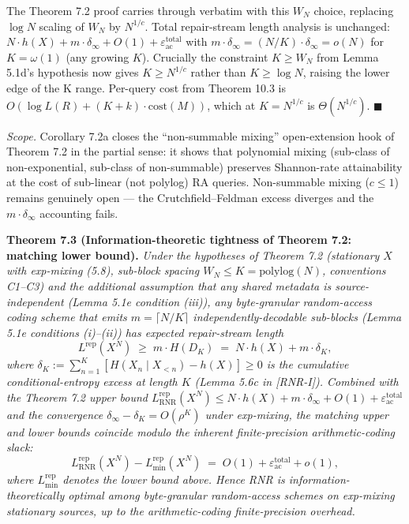 \documentclass[
]{article}
\begin{document}
The Theorem 7.2 proof carries through verbatim with this $W_N$ choice,
replacing $\log N$ scaling of $W_N$ by $N^{1/c}$. Total repair-stream
length analysis is unchanged: $N \cdot h(X) + m \cdot \delta_\infty +
O(1) + \varepsilon_{\mathrm{ac}}^{\mathrm{total}}$ with
$m \cdot \delta_\infty = (N/K) \cdot \delta_\infty = o(N)$ for
$K = \omega(1)$ (any growing $K$). Crucially the constraint
$K \geq W_N$ from Lemma 5.1d's hypothesis now gives
$K \geq N^{1/c}$ rather than $K \geq \log N$, raising the lower edge
of the K range. Per-query cost from Theorem 10.3 is
$O(\log L(R) + (K+k) \cdot \mathrm{cost}(M))$, which at $K = N^{1/c}$
is $\Theta(N^{1/c})$.
\hfill$\blacksquare$

\emph{Scope.} Corollary 7.2a closes the ``non-summable mixing''
open-extension hook of Theorem 7.2 in the partial sense: it shows
that polynomial mixing (sub-class of non-exponential, sub-class of
non-summable) preserves Shannon-rate attainability at the cost of
sub-linear (not polylog) RA queries. Non-summable mixing ($c \leq 1$)
remains genuinely open --- the Crutchfield--Feldman excess diverges
and the $m \cdot \delta_\infty$ accounting fails.

\textbf{Theorem 7.3 (Information-theoretic tightness of Theorem 7.2:
matching lower bound).} \emph{Under the hypotheses of Theorem 7.2
(stationary $X$ with exp-mixing (5.8), sub-block spacing
$W_N \leq K = \mathrm{polylog}(N)$, conventions C1--C3) and the
additional assumption that any shared metadata is source-independent
(Lemma 5.1e condition (iii)), any byte-granular random-access coding
scheme that emits $m = \lceil N/K \rceil$ independently-decodable
sub-blocks (Lemma 5.1e conditions (i)--(ii)) has expected
repair-stream length}
\[
L^{\mathrm{rep}}(X^N) \;\geq\; m \cdot H(D_K) \;=\; N \cdot h(X) + m \cdot \delta_K,
\]
\emph{where $\delta_K := \sum_{n=1}^K [H(X_n \mid X_{<n}) - h(X)] \geq 0$
is the cumulative conditional-entropy excess at length $K$
(Lemma 5.6c in [RNR-I]). Combined with the Theorem 7.2 upper bound
$L^{\mathrm{rep}}_{\mathrm{RNR}}(X^N) \leq N \cdot h(X) +
m \cdot \delta_\infty + O(1) + \varepsilon_{\mathrm{ac}}^{\mathrm{total}}$
and the convergence $\delta_\infty - \delta_K = O(\rho^K)$ under
exp-mixing, the matching upper and lower bounds coincide modulo
the inherent finite-precision arithmetic-coding slack:}
\[
L^{\mathrm{rep}}_{\mathrm{RNR}}(X^N) - L^{\mathrm{rep}}_{\min}(X^N)
\;=\; O(1) + \varepsilon_{\mathrm{ac}}^{\mathrm{total}} + o(1),
\]
\emph{where $L^{\mathrm{rep}}_{\min}$ denotes the lower bound above.
Hence RNR is information-theoretically optimal among byte-granular
random-access schemes on exp-mixing stationary sources, up to the
arithmetic-coding finite-precision overhead.}
\end{document}
